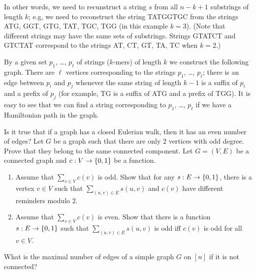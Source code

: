 In other words, we need to recunstruct a string $s$ from all $n - k + 1$
substrings of length $k$; e.g, we need to reconstruct the string TATGGTGC
from the strings ATG, GGT, GTG, TAT, TGC, TGG (in this example $k = 3$).
(Note that different strings may have the same sets of substrings.
Strings GTATCT and GTCTAT correspond to the strings
AT, CT, GT, TA, TC when $k = 2$.)

By a given set $p_1$, \dots, $p_\ell$ of strings ($k$-mers) of length $k$
we construct the following graph. There are $\ell$ vertices corresponding to
the strings $p_1$, \dots, $p_\ell$; there is an edge between $p_i$ and $p_j$
whenever the same string of length $k - 1$ is a suffix of $p_i$ and a
prefix of $p_j$ (for example, TG is a suffix of ATG and a prefix of TGG).
It is easy to see that we can find a string corresponding to
$p_1$, \dots, $p_\ell$ if we have a Hamiltonian path in the graph.

\begin{chapterendexercises}
  \exercise Is it true that if a graph has a closed Eulerian walk, then it has
    an even number of edges?
  \exercise[recommended] Let $G$ be a graph such that there are only $2$
    vertices with odd degree. Prove that they belong to the same connected
    component.
  \exercise Let $G = (V, E)$ be a connected graph and $c : V \to \set{0, 1}$
    be a function.
    \begin{enumerate}
      \item Assume that $\sum_{v \in V} c(v)$ is odd.
        Show that for any $s : E \to \set{0, 1}$, there is a vertex
        $v \in V$ such that $\sum_{(u, v) \in E} s(u, v)$ and $c(v)$
        have different reminders modulo $2$.
      \item Assume that $\sum_{v \in V} c(v)$ is even.
        Show that there is a function $s : E \to \set{0, 1}$
        such that $\sum_{(u, v) \in E} s(u, v)$ is odd iff $c(v)$ is odd
        for all $v \in V$.
    \end{enumerate}
  \exercise What is the maximal number of edges of a simple graph $G$ on $[n]$
    if it is not connected?
\end{chapterendexercises}
